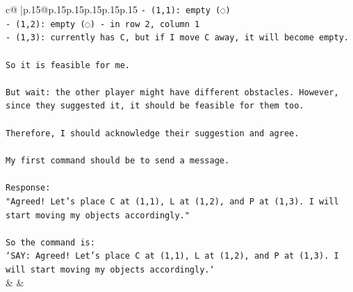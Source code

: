 \documentclass{article}
\begin{document}
{\begin{supertabular}{c@{$\;$}|p{.15\linewidth}@{}p{.15\linewidth}p{.15\linewidth}p{.15\linewidth}p{.15\linewidth}p{.15\linewidth}}
{{{\texttt{{-} (1,1): empty (◌)} \\
\texttt{{-} (1,2): empty (◌) {-} in row 2, column 1} \\
\texttt{{-} (1,3): currently has C, but if I move C away, it will become empty.} \\
\\ 
\texttt{So it is feasible for me.} \\
\\ 
\texttt{But wait: the other player might have different obstacles. However, since they suggested it, it should be feasible for them too.} \\
\\ 
\texttt{Therefore, I should acknowledge their suggestion and agree.} \\
\\ 
\texttt{My first command should be to send a message.} \\
\\ 
\texttt{Response:} \\
\texttt{"Agreed! Let's place C at (1,1), L at (1,2), and P at (1,3). I will start moving my objects accordingly."} \\
\\ 
\texttt{So the command is:} \\
\texttt{`SAY: Agreed! Let's place C at (1,1), L at (1,2), and P at (1,3). I will start moving my objects accordingly.`} \\
            }
        }
    }
    & & \\ \\


\end{supertabular}}
\end{document}
